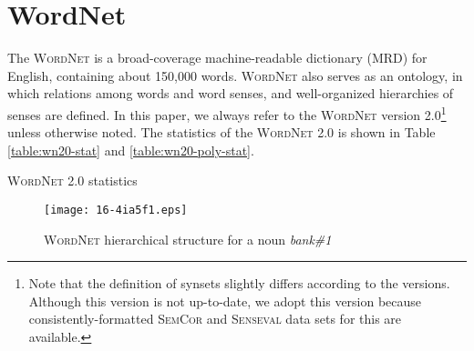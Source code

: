 \documentclass[english]{jnlp_1.4}
\begin{document}
\section{WordNet}
\label{section:wordnet}


The \textsc{WordNet} \cite{miller:1995} is a broad-coverage machine-readable dictionary (MRD) for English, containing about 150,000 words.
\textsc{WordNet} also serves as an ontology, in which relations among words and word senses, and well-organized hierarchies of senses are defined.
In this paper, we always refer to the \textsc{WordNet} version 2.0\footnote{Note that the definition of synsets slightly differs according to the versions. Although this version is not up-to-date, we adopt this version because consistently-formatted \textsc{SemCor} and \textsc{Senseval} data sets for this are available.} unless otherwise noted.
The statistics of the \textsc{WordNet} 2.0 is shown in Table \ref{table:wn20-stat} and \ref{table:wn20-poly-stat}.

\begin{table}[b]
\setlength{\captionwidth}{0.5\textwidth}
\begin{minipage}[t]{0.4\textwidth}
\caption{\textsc{WordNet} 2.0 statistics}
\label{table:wn20-stat}

\end{minipage}
\hfill
\begin{minipage}[t]{0.5\textwidth}
\label{table:wn20-poly-stat}

\end{minipage}
\end{table} 
\begin{figure}[b]
\begin{center}
\texttt{[image: 16-4ia5f1.eps]}
\end{center}
\caption{\textsc{WordNet} hierarchical structure for a noun \textit{bank\#1}}
\label{figure:wordnet-hierarchy-bank}
\end{figure}
\end{document}
